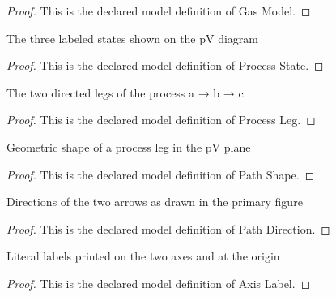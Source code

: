 \begin{proof}
  This is the declared model definition of Gas Model.
\end{proof}
\begin{definition}
  \label{def:physics:phyx-mini-0337:phyxminiproblems-problemphyxmini0337-processstate}
  The three labeled states shown on the pV diagram
\end{definition}
\begin{proof}
  This is the declared model definition of Process State.
\end{proof}
\begin{definition}
  \label{def:physics:phyx-mini-0337:phyxminiproblems-problemphyxmini0337-processleg}
  The two directed legs of the process a → b → c
\end{definition}
\begin{proof}
  This is the declared model definition of Process Leg.
\end{proof}
\begin{definition}
  \label{def:physics:phyx-mini-0337:phyxminiproblems-problemphyxmini0337-pathshape}
  Geometric shape of a process leg in the pV plane
\end{definition}
\begin{proof}
  This is the declared model definition of Path Shape.
\end{proof}
\begin{definition}
  \label{def:physics:phyx-mini-0337:phyxminiproblems-problemphyxmini0337-pathdirection}
  Directions of the two arrows as drawn in the primary figure
\end{definition}
\begin{proof}
  This is the declared model definition of Path Direction.
\end{proof}
\begin{definition}
  \label{def:physics:phyx-mini-0337:phyxminiproblems-problemphyxmini0337-axislabel}
  Literal labels printed on the two axes and at the origin
\end{definition}
\begin{proof}
  This is the declared model definition of Axis Label.
\end{proof}
